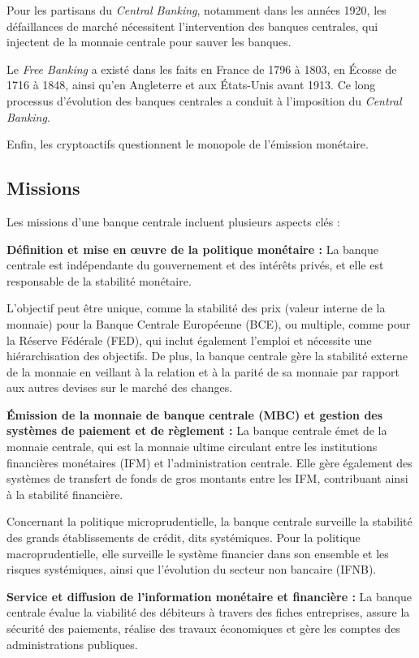 \documentclass[a4paper, 12pt]{report}
\begin{document}
Pour les partisans du \textit{Central Banking}, notamment dans les années 1920, les défaillances de marché nécessitent l'intervention des banques centrales, qui injectent de la monnaie centrale pour sauver les banques.

Le \textit{Free Banking} a existé dans les faits en France de 1796 à 1803, en Écosse de 1716 à 1848, ainsi qu'en Angleterre et aux États-Unis avant 1913. Ce long processus d'évolution des banques centrales a conduit à l'imposition du \textit{Central Banking}.

Enfin, les cryptoactifs questionnent le monopole de l'émission monétaire.
\subsection{Missions}

Les missions d'une banque centrale incluent plusieurs aspects clés :

\textbf{Définition et mise en œuvre de la politique monétaire :} La banque centrale est indépendante du gouvernement et des intérêts privés, et elle est responsable de la stabilité monétaire.

L'objectif peut être unique, comme la stabilité des prix (valeur interne de la monnaie) pour la Banque Centrale Européenne (BCE), ou multiple, comme pour la Réserve Fédérale (FED), qui inclut également l'emploi et nécessite une hiérarchisation des objectifs. De plus, la banque centrale gère la stabilité externe de la monnaie en veillant à la relation et à la parité de sa monnaie par rapport aux autres devises sur le marché des changes.

\textbf{Émission de la monnaie de banque centrale (MBC) et gestion des systèmes de paiement et de règlement :} La banque centrale émet de la monnaie centrale, qui est la monnaie ultime circulant entre les institutions financières monétaires (IFM) et l'administration centrale. Elle gère également des systèmes de transfert de fonds de gros montants entre les IFM, contribuant ainsi à la stabilité financière.

Concernant la politique microprudentielle, la banque centrale surveille la stabilité des grands établissements de crédit, dits systémiques. Pour la politique macroprudentielle, elle surveille le système financier dans son ensemble et les risques systémiques, ainsi que l'évolution du secteur non bancaire (IFNB).

\textbf{Service et diffusion de l'information monétaire et financière :} La banque centrale évalue la viabilité des débiteurs à travers des fiches entreprises, assure la sécurité des paiements, réalise des travaux économiques et gère les comptes des administrations publiques.
\end{document}
